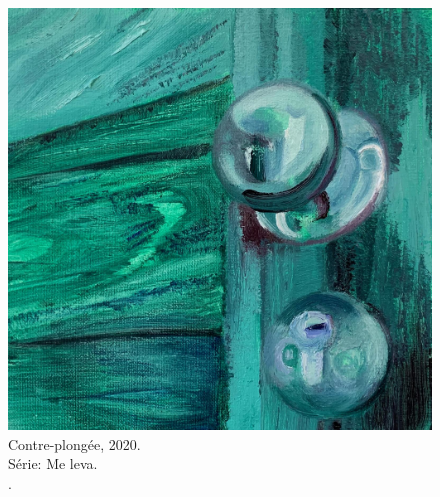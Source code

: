 \begin{figure}
\begin{minipage}[b]{.4\linewidth}
    \includegraphics[width = \linewidth]{apendice/pinturas-finalizadas/boudet-contre-plongee.pdf}
    \caption*{Contre-plongée, 2020. \\ Série: Me leva. \\ \oleolinho. \\ }
\end{minipage}
\end{figure}

\vfill


